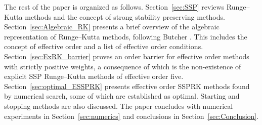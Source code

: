 The rest of the paper is organized as follows.
Section~\ref{sec:SSP} reviews Runge--Kutta methods and the concept of
strong stability preserving methods.
Section~\ref{sec:Algebraic_RK} presents a brief overview of the
algebraic representation of Runge--Kutta methods, following Butcher
\cite{Butcher2008_book}.
This includes the concept of effective order and a list of effective
order conditions.
Section~\ref{sec:ExRK_barrier} proves an order barrier for effective
order methods with strictly positive weights, a consequence of which
is the non-existence of explicit SSP Runge--Kutta methods of effective
order five.
Section~\ref{sec:optimal_ESSPRK} presents effective order SSPRK
methods found by numerical search, some of which are established as
optimal.
Starting and stopping methods are also discussed.
The paper concludes with numerical experiments in
Section~\ref{sec:numerics} and conclusions in
Section~\ref{sec:Conclusion}.

